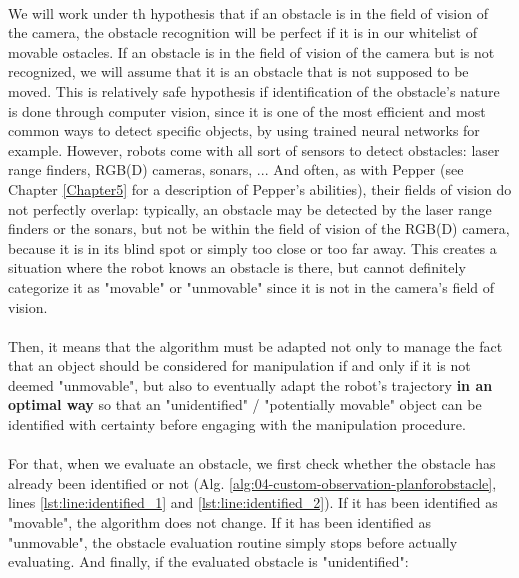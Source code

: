 \paragraph{} We will work under th hypothesis that if an obstacle is in the field of vision of the camera, the obstacle recognition will be perfect if it is in our whitelist of movable ostacles. If an obstacle is in the field of vision of the camera but is not recognized, we will assume that it is an obstacle that is not supposed to be moved. This is relatively safe hypothesis if identification of the obstacle's nature is done through computer vision, since it is one of the most efficient and most common ways to detect specific objects, by using trained neural networks for example\parencite{redmon_yolo9000:_2016}. However, robots come with all sort of sensors to detect obstacles: laser range finders, RGB(D) cameras, sonars, ... And often, as with Pepper (see Chapter \ref{Chapter5} for a description of Pepper's abilities), their fields of vision do not perfectly overlap: typically, an obstacle may be detected by the laser range finders or the sonars, but not be within the field of vision of the RGB(D) camera, because it is in its blind spot or simply too close or too far away. This creates a situation where the robot knows an obstacle is there, but cannot definitely categorize it as "movable" or "unmovable" since it is not in the camera's field of vision.

\paragraph{} Then, it means that the algorithm must be adapted not only to manage the fact that an object should be considered for manipulation if and only if it is not deemed "unmovable", but also to eventually adapt the robot's trajectory \textbf{in an optimal way} so that an "unidentified" / "potentially movable" object can be identified with certainty before engaging with the manipulation procedure.

\paragraph{} For that, when we evaluate an obstacle, we first check whether the obstacle has already been identified or not (Alg. \ref{alg:04-custom-observation-planforobstacle}, lines \ref{lst:line:identified_1} and \ref{lst:line:identified_2}). If it has been identified as "movable", the algorithm does not change. If it has been identified as "unmovable", the obstacle evaluation routine simply stops before actually evaluating. And finally, if the evaluated obstacle is "unidentified":

